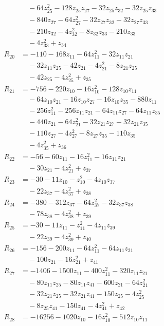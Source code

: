 \begin{align*}
&\quad -64z_{25}^{2} -128z_{25}z_{27} -32z_{25}z_{32} -32z_{25}z_{33} \\
&\quad -840z_{27} -64z_{27}^{2} -32z_{27}z_{32} -32z_{27}z_{33} \\
&\quad -210z_{32} -4z_{32}^{2} -8z_{32}z_{33} -210z_{33} \\
&\quad -4z_{33}^{2} +z_{34} \\
R_{20} &= -110 -168z_{11} -64z_{11}^{2} -32z_{11}z_{21} \\
&\quad -32z_{11}z_{25} -42z_{21} -4z_{21}^{2} -8z_{21}z_{25} \\
&\quad -42z_{25} -4z_{25}^{2} +z_{35} \\
R_{21} &= -756 -220z_{10} -16z_{10}^{2} -128z_{10}z_{11} \\
&\quad -64z_{10}z_{21} -16z_{10}z_{27} -16z_{10}z_{35} -880z_{11} \\
&\quad -256z_{11}^{2} -256z_{11}z_{21} -64z_{11}z_{27} -64z_{11}z_{35} \\
&\quad -440z_{21} -64z_{21}^{2} -32z_{21}z_{27} -32z_{21}z_{35} \\
&\quad -110z_{27} -4z_{27}^{2} -8z_{27}z_{35} -110z_{35} \\
&\quad -4z_{35}^{2} +z_{36} \\
R_{22} &= -56 -60z_{11} -16z_{11}^{2} -16z_{11}z_{21} \\
&\quad -30z_{21} -4z_{21}^{2} +z_{37} \\
R_{23} &= -30 -11z_{10} -z_{10}^{2} -4z_{10}z_{37} \\
&\quad -22z_{37} -4z_{37}^{2} +z_{38} \\
R_{24} &= -380 -312z_{37} -64z_{37}^{2} -32z_{37}z_{38} \\
&\quad -78z_{38} -4z_{38}^{2} +z_{39} \\
R_{25} &= -30 -11z_{11} -z_{11}^{2} -4z_{11}z_{39} \\
&\quad -22z_{39} -4z_{39}^{2} +z_{40} \\
R_{26} &= -156 -200z_{11} -64z_{11}^{2} -64z_{11}z_{21} \\
&\quad -100z_{21} -16z_{21}^{2} +z_{41} \\
R_{27} &= -1406 -1500z_{11} -400z_{11}^{2} -320z_{11}z_{21} \\
&\quad -80z_{11}z_{25} -80z_{11}z_{41} -600z_{21} -64z_{21}^{2} \\
&\quad -32z_{21}z_{25} -32z_{21}z_{41} -150z_{25} -4z_{25}^{2} \\
&\quad -8z_{25}z_{41} -150z_{41} -4z_{41}^{2} +z_{42} \\
R_{28} &= -16256 -1020z_{10} -16z_{10}^{2} -512z_{10}z_{11} \\

\end{align*}

